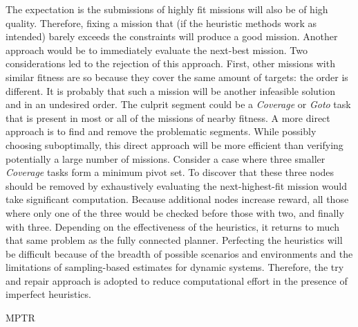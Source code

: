 \documentclass{tamuccthesis}
\begin{document}
The expectation is the submissions of highly fit missions will also be of high quality. Therefore, fixing a mission that (if the heuristic methods work as intended) barely exceeds the constraints will produce a good mission. Another approach would be to immediately evaluate the next-best mission. Two considerations led to the rejection of this approach. First, other missions with similar fitness are so because they cover the same amount of targets: the order is different. It is probably that such a mission will be another infeasible solution and in an undesired order. The culprit segment could be a \textit{Coverage} or \textit{Goto} task that is present in most or all of the missions of nearby fitness. A more direct approach is to find and remove the problematic segments. While possibly choosing suboptimally, this direct approach will be more efficient than verifying potentially a large number of missions. Consider a case where three smaller \textit{Coverage} tasks form a minimum pivot set. To discover that these three nodes should be removed by exhaustively evaluating the next-highest-fit mission would take significant computation. Because additional nodes increase reward, all those where only one of the three would be checked before those with two, and finally with three. Depending on the effectiveness of the heuristics, it returns to much that same problem as the fully connected planner. Perfecting the heuristics will be difficult because of the breadth of possible scenarios and environments and the limitations of sampling-based estimates for dynamic systems. Therefore, the try and repair approach is adopted to reduce computational effort in the presence of imperfect heuristics. 

\begin{algorithm}%

\caption{MPTR} 
\label{alg:MPTR}
\end{algorithm}
\end{document}
